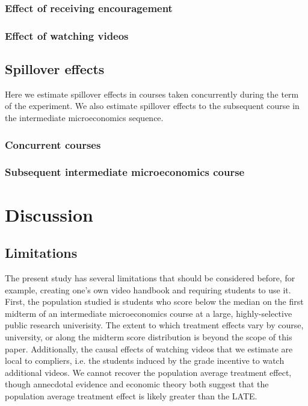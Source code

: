 \documentclass[12pt]{article}
\begin{document}
\subsubsection{Effect of receiving encouragement}

\subsubsection{Effect of watching videos}


\subsection{Spillover effects}

Here we estimate spillover effects in courses taken concurrently during the term of the experiment. We also estimate spillover effects to the subsequent course in the intermediate microeconomics sequence.

\subsubsection{Concurrent courses}

\subsubsection{Subsequent intermediate microeconomics course}




\section{Discussion} \label{discussion}

\subsection{Limitations}

The present study has several limitations that should be considered before, for example, creating one's own video handbook and requiring students to use it. First, the population studied is students who score below the median on the first midterm of an intermediate microeconomics course at a large, highly-selective public research univerisity. The extent to which treatment effects vary by course, university, or along the midterm score distribution is beyond the scope of this paper. Additionally, the causal effects of watching videos that we estimate are local to compliers, i.e. the students induced by the grade incentive to watch additional videos. We cannot recover the population average treatment effect, though annecdotal evidence and economic theory both suggest that the population average treatment effect is likely greater than the LATE.
\end{document}
